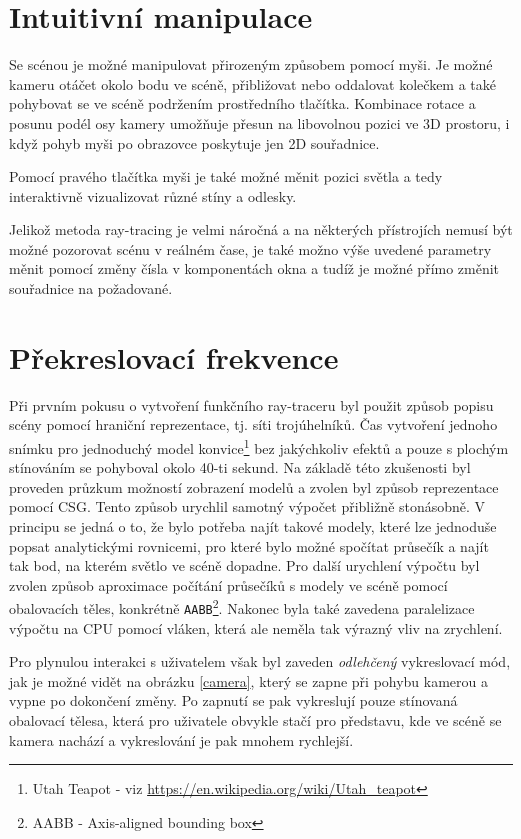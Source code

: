 \documentclass[12pt,a4paper,titlepage,final]{report}
\begin{document}
\section{Intuitivní manipulace}
Se scénou je možné manipulovat přirozeným způsobem pomocí myši. Je možné kameru otáčet okolo bodu ve scéně, přibližovat nebo oddalovat kolečkem a také pohybovat se ve scéně podržením prostředního tlačítka.
Kombinace rotace a posunu podél osy kamery umožňuje přesun na libovolnou pozici ve 3D prostoru, i když pohyb myši po obrazovce poskytuje jen 2D souřadnice. 

Pomocí pravého tlačítka myši je také možné měnit pozici světla a tedy interaktivně vizualizovat různé stíny a odlesky.

Jelikož metoda ray-tracing je velmi náročná a na některých přístrojích nemusí být možné pozorovat scénu v reálném čase, je také možno výše uvedené parametry měnit pomocí změny čísla v komponentách okna a tudíž je možné přímo změnit souřadnice na požadované.

\section{Překreslovací frekvence}
\label{sec:fps}

Při prvním pokusu o vytvoření funkčního ray-traceru byl použit způsob popisu scény pomocí hraniční reprezentace, tj. síti trojúhelníků. Čas vytvoření jednoho snímku pro jednoduchý model konvice\footnote{Utah Teapot - viz \url{https://en.wikipedia.org/wiki/Utah_teapot}} bez jakýchkoliv efektů a pouze s plochým stínováním se pohyboval okolo 40-ti sekund. Na základě této zkušenosti byl proveden průzkum možností zobrazení modelů a zvolen byl způsob reprezentace pomocí CSG. Tento způsob urychlil samotný výpočet přibližně stonásobně. V principu se jedná o to, že bylo potřeba najít takové modely, které lze jednoduše popsat analytickými rovnicemi, pro které bylo možné spočítat průsečík a najít tak bod, na kterém světlo ve scéně dopadne. Pro další urychlení výpočtu byl zvolen způsob aproximace počítání průsečíků s modely ve scéně pomocí obalovacích těles, konkrétně \texttt{AABB}\footnote{AABB - Axis-aligned bounding box}. Nakonec byla také zavedena paralelizace výpočtu na CPU pomocí vláken, která ale neměla tak výrazný vliv na zrychlení.

Pro plynulou interakci s uživatelem však byl zaveden \emph{odlehčený} vykreslovací mód, jak je možné vidět na obrázku \ref{camera}, který se zapne při pohybu kamerou a vypne po dokončení změny. Po zapnutí se pak vykreslují pouze stínovaná obalovací tělesa, která pro uživatele obvykle stačí pro představu, kde ve scéně se kamera nachází a vykreslování je pak mnohem rychlejší. 
\end{document}
